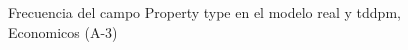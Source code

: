 \begin{figure}[H]
    \centering
    
    \caption{Frecuencia del campo Property type en el modelo real y tddpm, Economicos (A-3)}
    \label{frecuency-Property Type-tddpm_mlp}
\end{figure}